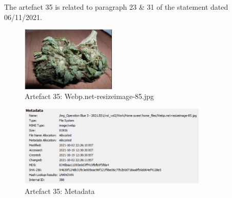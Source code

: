 The artefact 35 is related to paragraph 23 \& 31 of the statement
dated 06/11/2021.
\begin{figure}[H]
  \centering
  \includegraphics[width=0.4\textwidth]{figures/artefact35}
  \caption{Artefact 35: Webp.net-resizeimage-85.jpg}
  \label{f:artefact35}
\end{figure}
\begin{figure}[H]
  \centering
  \includegraphics[width=0.8\textwidth]{figures/meta35}
  \caption{Artefact 35: Metadata}
  \label{f:meta35}
\end{figure}

